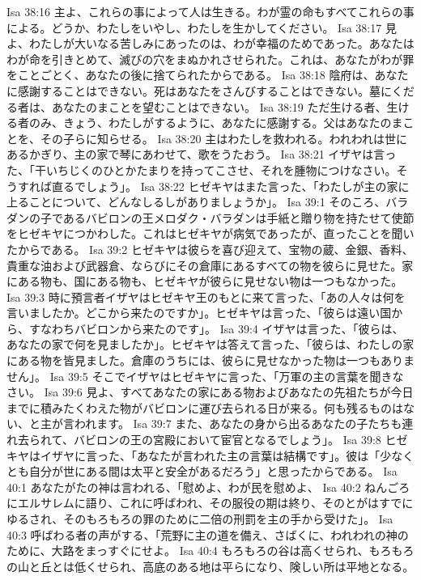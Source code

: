 Isa 38:16  主よ、これらの事によって人は生きる。わが霊の命もすべてこれらの事による。どうか、わたしをいやし、わたしを生かしてください。
Isa 38:17  見よ、わたしが大いなる苦しみにあったのは、わが幸福のためであった。あなたはわが命を引きとめて、滅びの穴をまぬかれさせられた。これは、あなたがわが罪をことごとく、あなたの後に捨てられたからである。
Isa 38:18  陰府は、あなたに感謝することはできない。死はあなたをさんびすることはできない。墓にくだる者は、あなたのまことを望むことはできない。
Isa 38:19  ただ生ける者、生ける者のみ、きょう、わたしがするように、あなたに感謝する。父はあなたのまことを、その子らに知らせる。
Isa 38:20  主はわたしを救われる。われわれは世にあるかぎり、主の家で琴にあわせて、歌をうたおう。
Isa 38:21  イザヤは言った、「干いちじくのひとかたまりを持ってこさせ、それを腫物につけなさい。そうすれば直るでしょう」。
Isa 38:22  ヒゼキヤはまた言った、「わたしが主の家に上ることについて、どんなしるしがありましょうか」。
Isa 39:1  そのころ、バラダンの子であるバビロンの王メロダク・バラダンは手紙と贈り物を持たせて使節をヒゼキヤにつかわした。これはヒゼキヤが病気であったが、直ったことを聞いたからである。
Isa 39:2  ヒゼキヤは彼らを喜び迎えて、宝物の蔵、金銀、香料、貴重な油および武器倉、ならびにその倉庫にあるすべての物を彼らに見せた。家にある物も、国にある物も、ヒゼキヤが彼らに見せない物は一つもなかった。
Isa 39:3  時に預言者イザヤはヒゼキヤ王のもとに来て言った、「あの人々は何を言いましたか。どこから来たのですか」。ヒゼキヤは言った、「彼らは遠い国から、すなわちバビロンから来たのです」。
Isa 39:4  イザヤは言った、「彼らは、あなたの家で何を見ましたか」。ヒゼキヤは答えて言った、「彼らは、わたしの家にある物を皆見ました。倉庫のうちには、彼らに見せなかった物は一つもありません」。
Isa 39:5  そこでイザヤはヒゼキヤに言った、「万軍の主の言葉を聞きなさい。
Isa 39:6  見よ、すべてあなたの家にある物およびあなたの先祖たちが今日までに積みたくわえた物がバビロンに運び去られる日が来る。何も残るものはない、と主が言われます。
Isa 39:7  また、あなたの身から出るあなたの子たちも連れ去られて、バビロンの王の宮殿において宦官となるでしょう」。
Isa 39:8  ヒゼキヤはイザヤに言った、「あなたが言われた主の言葉は結構です」。彼は「少なくとも自分が世にある間は太平と安全があるだろう」と思ったからである。
Isa 40:1  あなたがたの神は言われる、「慰めよ、わが民を慰めよ、
Isa 40:2  ねんごろにエルサレムに語り、これに呼ばわれ、その服役の期は終り、そのとがはすでにゆるされ、そのもろもろの罪のために二倍の刑罰を主の手から受けた」。
Isa 40:3  呼ばわる者の声がする、「荒野に主の道を備え、さばくに、われわれの神のために、大路をまっすぐにせよ。
Isa 40:4  もろもろの谷は高くせられ、もろもろの山と丘とは低くせられ、高底のある地は平らになり、険しい所は平地となる。
